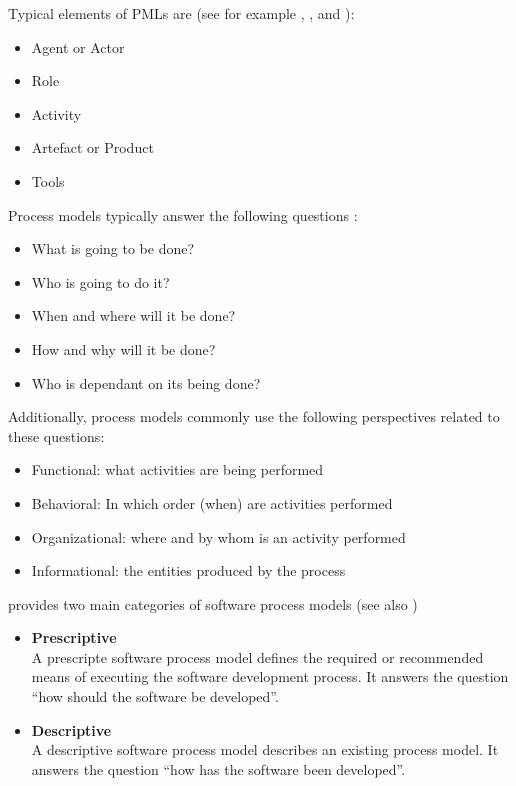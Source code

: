 Typical elements of \acp{PML} are (see for example \cite{Benali:1992gq}, \cite{Acuna:2001aa}, \cite{Fuggetta:2000ds} and \cite{Curtis:1992kf}):
\begin{itemize}
	\item Agent or Actor
	\item Role
	\item Activity
	\item Artefact or Product
	\item Tools 
\end{itemize}

Process models typically answer the following questions \citep{Curtis:1992kf}:
\begin{itemize}
	\item What is going to be done?
	\item Who is going to do it?
	\item When and where will it be done?
	\item How and why will it be done?
	\item Who is dependant on its being done?
\end{itemize}

Additionally, process models commonly use the following perspectives related to these questions:
\begin{itemize}
	\item Functional: what activities are being performed
	\item Behavioral: In which order (when) are activities performed
	\item Organizational: where and by whom is an activity performed
	\item Informational: the entities produced by the process
\end{itemize}

\cite{McChesney:1995aa} provides two main categories of software process models (see also \cite{Acuna:2001aa})
\begin{itemize}
	\item \textbf{Prescriptive}\\
	A prescripte software process model defines the required or recommended means of executing the software development process. It answers the question ``how should the software be developed''.
	\item \textbf{Descriptive}\\
	A descriptive software process model describes an existing process model. It answers the question ``how has the software been developed''.
\end{itemize}

